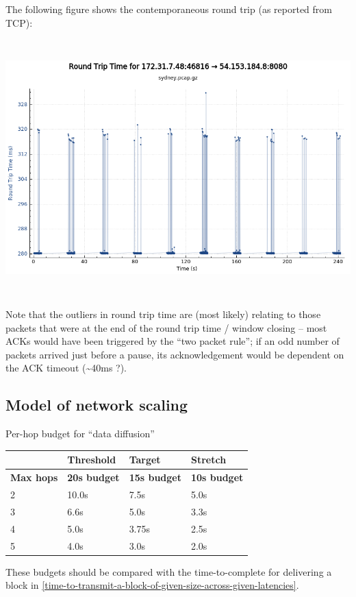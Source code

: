 \documentclass[11pt,a4paper]{article}
\begin{document}
The following figure shows the contemporaneous round trip (as reported
from TCP):

\includegraphics[width=6.27083in,height=3.88889in]{./media/image4.png}

Note that the outliers in round trip time are (most likely) relating to
those packets that were at the end of the round trip time / window
closing -- most ACKs would have been triggered by the ``two packet
rule''; if an odd number of packets arrived just before a pause, its
acknowledgement would be dependent on the ACK timeout
(\textasciitilde{}40ms ?).

\subsection{Model of network scaling}
\label{model-of-network-scaling}

Per-hop budget for ``data diffusion''

\begin{longtable}[]{@{}llll@{}}
\toprule
& Threshold & Target & Stretch\tabularnewline
\midrule
\endhead
\textbf{Max hops} & \textbf{20s budget} & \textbf{15s budget} &
\textbf{10s budget}\tabularnewline
2 & 10.0s & 7.5s & 5.0s\tabularnewline
3 & 6.6s & 5.0s & 3.3s\tabularnewline
4 & 5.0s & 3.75s & 2.5s\tabularnewline
5 & 4.0s & 3.0s & 2.0s\tabularnewline
\bottomrule
\end{longtable}

These budgets should be compared with the time-to-complete for
delivering a block in \cref{time-to-transmit-a-block-of-given-size-across-given-latencies}.
\end{document}
